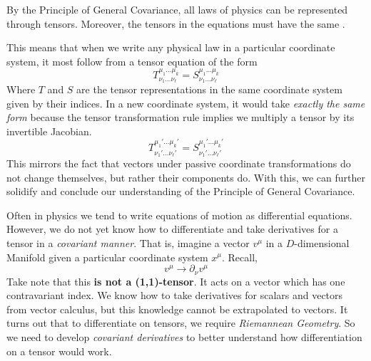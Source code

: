 \documentclass{article}
\begin{document}
 			\begin{lem}
 				By the Principle of General Covariance, all laws of physics can be represented through tensors. Moreover, the tensors in the equations must have the same .
 			\end{lem}
 			
 			This means that when we write any physical law in a particular coordinate system, it most follow from a tensor equation of the form
 			$$ T^{\mu_1 \dots \mu_k}_{\nu_1 \dots \nu_\ell} = S^{\mu_1 \dots \mu_k}_{\nu_1 \dots \nu_\ell} $$
 			Where $T$ and $S$ are the tensor representations in the same coordinate system given by their indices. In a new coordinate system, it would take \textit{exactly the same form} because the tensor transformation rule implies we multiply a tensor by its invertible Jacobian.
 			$$ T_{\nu_1' \dots \nu_\ell'}^{\mu_1' \dots \mu_k'} = S_{\nu_1' \dots \nu_\ell'}^{\mu_1' \dots \mu_k'}$$
 			This mirrors the fact that vectors under passive coordinate transformations do not change themselves, but rather their components do. With this, we can further solidify and conclude our understanding of the Principle of General Covariance. 
 
 			Often in physics we tend to write equations of motion as differential equations. However, we do not yet know how to differentiate and take derivatives for a tensor in a \textit{covariant manner}. That is, imagine a vector $v^\mu$ in a $D$-dimensional Manifold given a particular coordinate system $x^\mu$. Recall,
 			$$ v^{\mu} \to \partial_\nu v^\mu $$
 			Take note that this \textbf{is not a (1,1)-tensor}. It acts on a vector which has one contravariant index. We know how to take derivatives for scalars and vectors from vector calculus, but this knowledge cannot be extrapolated to vectors. It turns out that to differentiate on tensors, we require \textit{Riemannean Geometry}. So we need to develop \textit{covariant derivatives} to better understand how differentiation on a tensor would work.
 			
\end{document}
